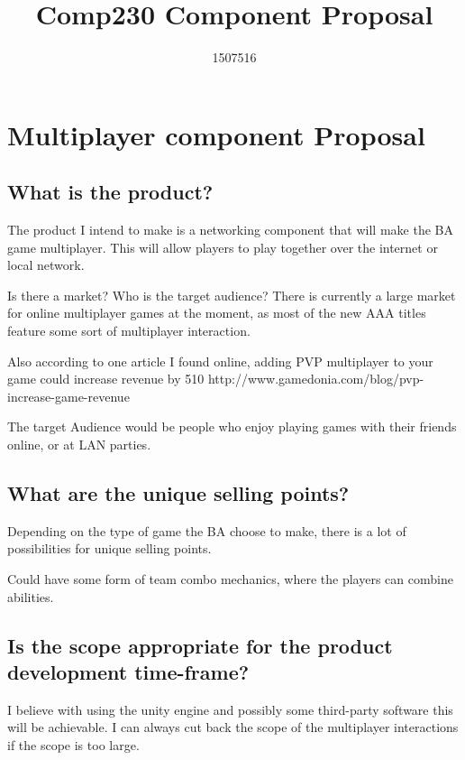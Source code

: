 \documentclass{scrartcl}
\title{Comp230 Component Proposal}
\author{1507516}
\begin{document}
\maketitle




\section{Multiplayer component Proposal}

\subsection{What is the product?}
The product I intend to make is a networking component that will make the BA game multiplayer.
This will allow players to play together over the internet or local network.

Is there a market? Who is the target audience?
There is currently a large market for online multiplayer games at the moment, as most of the new AAA titles feature some sort of multiplayer interaction. 

Also according to one article I found online, adding PVP multiplayer to your game could increase revenue by 510%
http://www.gamedonia.com/blog/pvp-increase-game-revenue

The target Audience would be people who enjoy playing games with their friends online, or at LAN parties.

\subsection{What are the unique selling points?}

Depending on the type of game the BA choose to make, there is a lot of possibilities for unique selling points.

 Could have some form of team combo mechanics, where the players can combine abilities.

\subsection{Is the scope appropriate for the product development time-frame?}

I believe with using the unity engine and possibly some third-party software this will be achievable. I can always cut back the scope of the multiplayer interactions if the scope is too large. 



\end{document}
